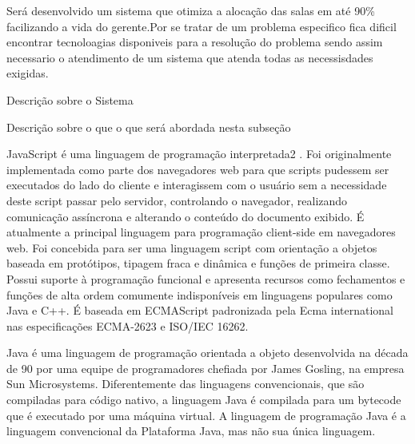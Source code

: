 \documentclass{abntpuc}
\begin{document}






%



Será desenvolvido um sistema que otimiza a alocação das salas em até 90\% facilizando a vida do gerente.Por se tratar de um problema especifico fica dificil encontrar tecnoloagias disponiveis para a resolução do problema sendo assim necessario o atendimento de um sistema que atenda todas as necessisdades exigidas.

	
	Descrição sobre o Sistema


	Descrição sobre o que o que será abordada nesta subseção


	JavaScript é uma linguagem de programação interpretada2 . Foi originalmente implementada como parte dos navegadores web para que scripts pudessem ser executados do lado do cliente e interagissem com o usuário sem a necessidade deste script passar pelo servidor, controlando o navegador, realizando comunicação assíncrona e alterando o conteúdo do documento exibido.
	É atualmente a principal linguagem para programação client-side em navegadores web. Foi concebida para ser uma linguagem script com orientação a objetos baseada em protótipos, tipagem fraca e dinâmica e funções de primeira classe. Possui suporte à programação funcional e apresenta recursos como fechamentos e funções de alta ordem comumente indisponíveis em linguagens populares como Java e C++.
	É baseada em ECMAScript padronizada pela Ecma international nas especificações ECMA-2623 e ISO/IEC 16262.

	Java é uma linguagem de programação orientada a objeto desenvolvida na década de 90 por uma equipe de programadores chefiada por James Gosling, na empresa Sun Microsystems. Diferentemente das linguagens convencionais, que são compiladas para código nativo, a linguagem Java é compilada para um bytecode que é executado por uma máquina virtual. A linguagem de programação Java é a linguagem convencional da Plataforma Java, mas não sua única linguagem.
\end{document}
